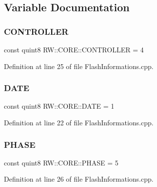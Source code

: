 \subsection{Variable Documentation}
\hypertarget{namespace_r_w_1_1_c_o_r_e_aeeadafd77ab6ae9024c8721a39e2c6d7}{}\label{namespace_r_w_1_1_c_o_r_e_aeeadafd77ab6ae9024c8721a39e2c6d7} 
\subsubsection{\texorpdfstring{C\+O\+N\+T\+R\+O\+L\+L\+ER}{CONTROLLER}}
{\footnotesize\ttfamily const quint8 R\+W\+::\+C\+O\+R\+E\+::\+C\+O\+N\+T\+R\+O\+L\+L\+ER = 4}



Definition at line 25 of file Flash\+Informations.\+cpp.

\hypertarget{namespace_r_w_1_1_c_o_r_e_ab143b8adddb28680256b515f6faa4cd1}{}\label{namespace_r_w_1_1_c_o_r_e_ab143b8adddb28680256b515f6faa4cd1} 
\subsubsection{\texorpdfstring{D\+A\+TE}{DATE}}
{\footnotesize\ttfamily const quint8 R\+W\+::\+C\+O\+R\+E\+::\+D\+A\+TE = 1}



Definition at line 22 of file Flash\+Informations.\+cpp.

\hypertarget{namespace_r_w_1_1_c_o_r_e_a20b9fbc004429b5ebfbee5c5ef385068}{}\label{namespace_r_w_1_1_c_o_r_e_a20b9fbc004429b5ebfbee5c5ef385068} 
\subsubsection{\texorpdfstring{P\+H\+A\+SE}{PHASE}}
{\footnotesize\ttfamily const quint8 R\+W\+::\+C\+O\+R\+E\+::\+P\+H\+A\+SE = 5}



Definition at line 26 of file Flash\+Informations.\+cpp.

\hypertarget{namespace_r_w_1_1_c_o_r_e_a8dcc285eebd3f8b770ebb99805098b20}{}\label{namespace_r_w_1_1_c_o_r_e_a8dcc285eebd3f8b770ebb99805098b20} 
